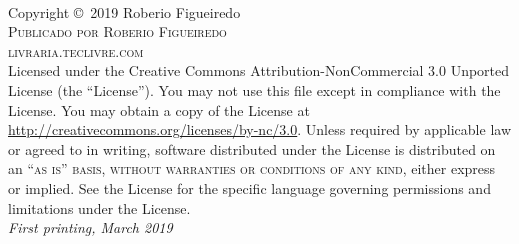 \documentclass[11pt,fleqn]{book} %
\begin{document}

\begingroup
\thispagestyle{empty} %
\vfill
\endgroup


\newpage
~\vfill
\thispagestyle{empty}

\noindent Copyright \copyright\ 2019 Roberio Figueiredo\\ %

\noindent \textsc{Publicado por Roberio Figueiredo}\\ %

\noindent \textsc{livraria.teclivre.com}\\ %

\noindent Licensed under the Creative Commons Attribution-NonCommercial 3.0 Unported License (the ``License''). You may not use this file except in compliance with the License. You may obtain a copy of the License at \url{http://creativecommons.org/licenses/by-nc/3.0}. Unless required by applicable law or agreed to in writing, software distributed under the License is distributed on an \textsc{``as is'' basis, without warranties or conditions of any kind}, either express or implied. See the License for the specific language governing permissions and limitations under the License.\\ %

\noindent \textit{First printing, March 2019} %
\end{document}
